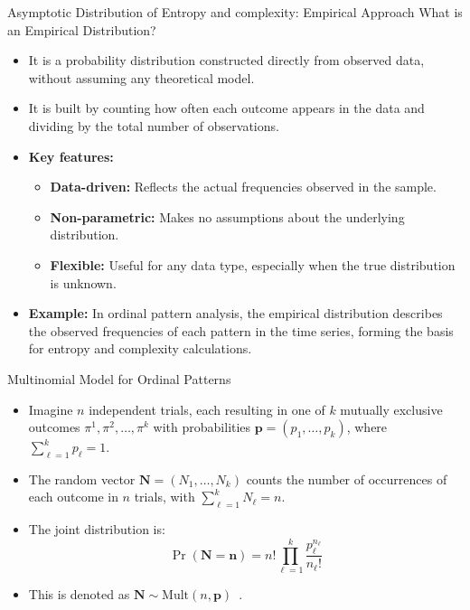 \documentclass{beamer}
\begin{document}
\begin{frame}{Asymptotic Distribution of Entropy and complexity: Empirical Approach}
What is an \alert{Empirical Distribution}?
	\begin{itemize}
		\item It is a probability distribution constructed directly from observed data, without assuming any theoretical model.
		\item It is built by counting how often each outcome appears in the data and dividing by the total number of observations.
		\item \textbf{Key features:}
		\begin{itemize}
			\item \textbf{Data-driven:} Reflects the actual frequencies observed in the sample.
			\item \textbf{Non-parametric:} Makes no assumptions about the underlying distribution.
			\item \textbf{Flexible:} Useful for any data type, especially when the true distribution is unknown.
		\end{itemize}
		\item \textbf{Example:} In ordinal pattern analysis, the empirical distribution describes the observed frequencies of each pattern in the time series, forming the basis for entropy and complexity calculations.~\cite{Chagas2020a}
	\end{itemize}
\end{frame}


\begin{frame}{Multinomial Model for Ordinal Patterns}
	\begin{itemize}
		\item Imagine $n$ independent trials, each resulting in one of $k$ mutually exclusive outcomes $\pi^1, \pi^2, \ldots, \pi^k$ with probabilities $\mathbf{p} = (p_1, \ldots, p_k)$, where $\sum_{\ell=1}^{k} p_\ell = 1$.
		\item The random vector $\mathbf{N} = (N_1, \ldots, N_k)$ counts the number of occurrences of each outcome in $n$ trials, with $\sum_{\ell=1}^{k} N_\ell = n$.
		\item The joint distribution is:
		\[
		\Pr(\mathbf{N} = \mathbf{n}) = n! \prod_{\ell=1}^{k} \frac{p_\ell^{n_\ell}}{n_\ell!}
		\]
		\item This is denoted as $\mathbf{N} \sim \text{Mult}(n, \mathbf{p})$~\cite{Rey2023}.
	\end{itemize}
\end{frame}
\end{document}
